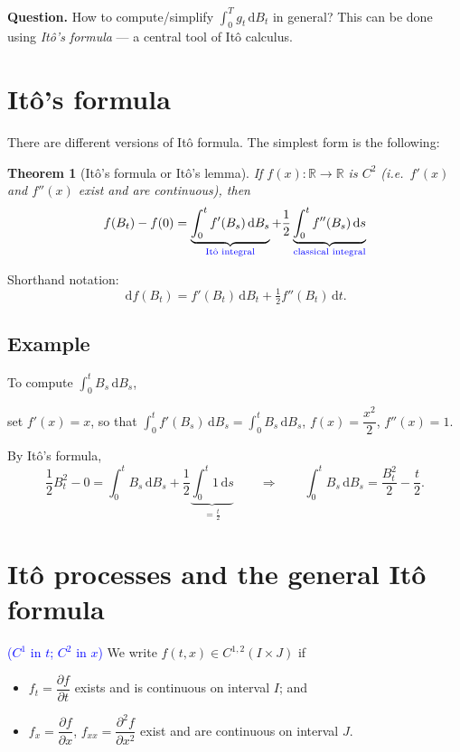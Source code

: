 \documentclass[11pt]{article}
\newcommand{\R}{\mathbb{R}}
\newcommand{\dd}{\,\mathrm{d}}
\newcommand{\ann}[1]{\textcolor{blue}{#1}}
\theoremstyle{definition}
\theoremstyle{plain}
\newtheorem{theorem}{Theorem}[section]
\begin{document}
\medskip
\noindent\textbf{Question.} How to compute/simplify $\int_0^Tg_t\dd B_t$ in general?
This can be done using \emph{It\^o's formula} --- a central tool of It\^o calculus.

\section{It\^o's formula}

There are different versions of It\^o formula. The simplest form is the following:

\begin{theorem}[It\^o's formula or It\^o's lemma]
If $f(x):\R\to\R$ is $C^2$ (i.e.\ $f'(x)$ and $f''(x)$ exist and are continuous), then
\[
  f(B_t)-f(0)
  =\underbrace{\int_0^tf'(B_s)\dd B_s}_{\ann{\text{It\^o integral}}}
  +\frac12\underbrace{\int_0^tf''(B_s)\dd s}_{\ann{\text{classical integral}}}
\]
\end{theorem}

\noindent Shorthand notation:
\[
  \dd f(B_t)=f'(B_t)\dd B_t+\tfrac12f''(B_t)\dd t .
\]

\subsection*{Example}

\noindent To compute $\int_0^tB_s\dd B_s$,

\noindent set $f'(x)=x$, so that $\int_0^tf'(B_s)\dd B_s=\int_0^tB_s\dd B_s$, \quad
$f(x)=\dfrac{x^2}{2}$, \quad $f''(x)=1$.

\noindent By It\^o's formula,
\[
  \frac12B_t^2-0=\int_0^tB_s\dd B_s+\frac12\underbrace{\int_0^t1\dd s}_{=\frac t2}
  \qquad\Longrightarrow\qquad
  \int_0^tB_s\dd B_s=\frac{B_t^2}{2}-\frac t2 .
\]

\section{It\^o processes and the general It\^o formula}

\ann{($C^1$ in $t$; $C^2$ in $x$)} We write $f(t,x)\in C^{1,2}(I\times J)$ if
\begin{itemize}
\item $f_t=\dfrac{\partial f}{\partial t}$ exists and is continuous on interval $I$; and
\item $f_x=\dfrac{\partial f}{\partial x}$, \;
      $f_{xx}=\dfrac{\partial^2f}{\partial x^2}$ exist and are continuous on interval $J$.
\end{itemize}
\end{document}
